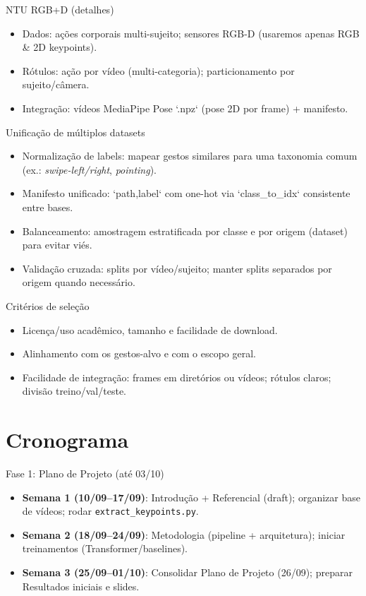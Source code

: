 \documentclass[aspectratio=169]{beamer}
\begin{document}
\begin{frame}{NTU RGB+D (detalhes)}
  \begin{itemize}
    \item Dados: ações corporais multi-sujeito; sensores RGB-D (usaremos apenas RGB \& 2D keypoints).
    \item Rótulos: ação por vídeo (multi-categoria); particionamento por sujeito/câmera.
    \item Integração: vídeos \Rightarrow MediaPipe Pose \Rightarrow `.npz` (pose 2D por frame) + manifesto.
  \end{itemize}
\end{frame}

\begin{frame}{Unificação de múltiplos datasets}
  \begin{itemize}
    \item Normalização de labels: mapear gestos similares para uma taxonomia comum (ex.: \emph{swipe-left/right}, \emph{pointing}).
    \item Manifesto unificado: `path,label` com one-hot via `class_to_idx` consistente entre bases.
    \item Balanceamento: amostragem estratificada por classe e por origem (dataset) para evitar viés.
    \item Validação cruzada: splits por vídeo/sujeito; manter splits separados por origem quando necessário.
  \end{itemize}
\end{frame}

\begin{frame}{Critérios de seleção}
  \begin{itemize}
    \item Licença/uso acadêmico, tamanho e facilidade de download.
    \item Alinhamento com os gestos-alvo e com o escopo geral.
    \item Facilidade de integração: frames em diretórios ou vídeos; rótulos claros; divisão treino/val/teste.
  \end{itemize}
\end{frame}

\section{Cronograma}
\begin{frame}{Fase 1: Plano de Projeto (até 03/10)}
  \begin{itemize}
    \item \textbf{Semana 1 (10/09–17/09)}: Introdução + Referencial (draft); organizar base de vídeos; rodar \texttt{extract\_keypoints.py}.
    \item \textbf{Semana 2 (18/09–24/09)}: Metodologia (pipeline + arquitetura); iniciar treinamentos (Transformer/baselines).
    \item \textbf{Semana 3 (25/09–01/10)}: Consolidar Plano de Projeto (26/09); preparar Resultados iniciais e slides.
  \end{itemize}
\end{frame}
\end{document}
